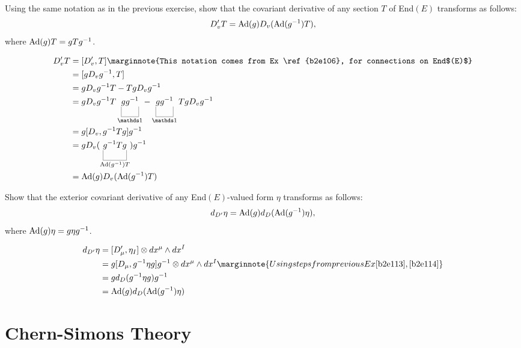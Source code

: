 \documentclass[10pt]{article}
\begin{document}
\begin{example}\label{b2e114}
	Using the same notation as in the previous exercise, show that the covariant derivative of any section $T$ of End$(E)$ transforms as follows:
	$$
	D_v^\prime T = \text{Ad}(g)D_v(\text{Ad}(g^{-1})T),
	$$
	where $\text{Ad}(g)T=gTg^{-1}$.
\end{example}
\sol 
$$
\begin{aligned}
	D_v^\prime T &= [D_v^\prime,T]\marginnote{This notation comes from Ex \ref{b2e106}, for connections on End$(E)$}\\
	&= [gD_vg^{-1},T]\\
	&= gD_vg^{-1}T - TgD_vg^{-1}\\
	&= gD_vg^{-1}T\ub{gg^{-1}}{\id} - \ub{gg^{-1}}{\id}TgD_vg^{-1}\\
	&= g[D_v,g^{-1}Tg]g^{-1}\\
	&= gD_v(\ub{g^{-1}Tg}{\Ad(g^{-1})T})g^{-1}\\
	&= \Ad(g)D_v(\Ad(g^{-1})T)
\end{aligned}
$$


\begin{example}
	Show that the exterior covariant derivative of any End$(E)$-valued form $\eta$ transforms as follows:
	$$
	d_{D^\prime}\eta = \text{Ad}(g)d_D(\text{Ad}(g^{-1})\eta),
	$$
	where $\text{Ad}(g)\eta=g\eta g^{-1}$.
\end{example}
\sol 
$$
\begin{aligned}
	d_{D^\prime}\eta &= [D_\mu^\prime,\eta_I] \otimes dx^\mu \wedge dx^I\\
	&= g[D_\mu,g^{-1}\eta g]g^{-1} \otimes dx^\mu \wedge dx^I\marginnote{Using steps from previous Ex \ref{b2e113}, \ref{b2e114}}\\
	&= g d_D(g^{-1}\eta g)g^{-1}\\
	&= \Ad(g)d_D(\Ad(g^{-1})\eta)
\end{aligned}
$$



\newpage
\section{Chern-Simons Theory}\label{b2c4}
\end{document}
